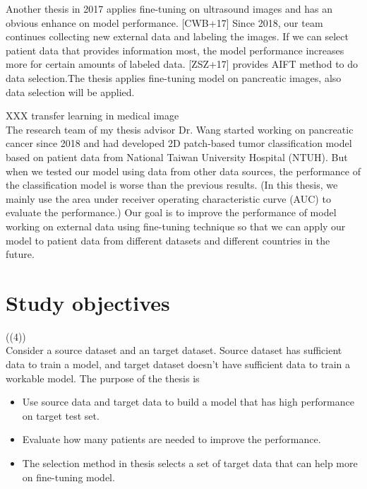 Another thesis in 2017 applies fine-tuning on ultrasound images and has an obvious enhance on model performance.  [CWB+17] Since  2018,  our  team  continues  collecting  new  external  data  and  labeling  the images.   If  we  can  select  patient  data  that  provides  information  most,  the  model performance increases more for certain amounts of labeled data.  [ZSZ+17] provides AIFT method to do data selection.The thesis applies fine-tuning model on pancreatic images,  also data selection will be applied.

XXX  transfer learning  in medical image \\
The research team of my thesis advisor Dr. Wang started working on pancreatic cancer since 2018 and had developed 2D patch-based tumor classification model based on patient data from National Taiwan University Hospital (NTUH). But when we tested our model using data from other data sources, the performance of the classification model is worse than the previous results. (In this thesis, we mainly use the area under receiver operating characteristic curve (AUC) to evaluate the performance.) Our goal is to improve the performance of model working on external data using fine-tuning technique so that we can apply our model to patient data from different datasets and different countries in the future.

\section{Study objectives}
((4))\\
Consider a source dataset and an target dataset. Source dataset has sufficient data to train a model, and target dataset doesn't have sufficient data to train a workable model. The purpose of the thesis is
\begin{itemize}
    \item Use source data and target data to build a model that has high performance on target test set.
    \item Evaluate how many patients are needed to improve the performance.
    \item The selection method in thesis \cite{zhou2017fine} selects a set of target data that can help more on fine-tuning model. 
\end{itemize}
